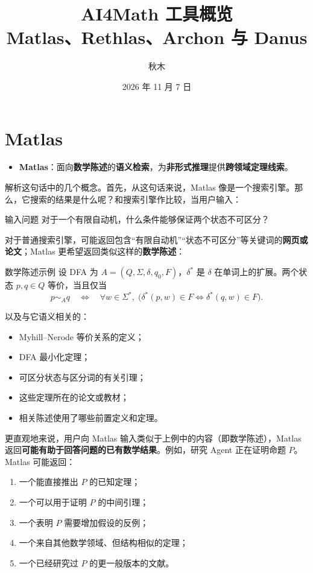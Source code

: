 \documentclass[11pt,a4paper]{ctexart}
\title{AI4Math 工具概览\\[0.35em]\large Matlas、Rethlas、Archon 与 Danus}
\author{秋木}
\date{2026 年 11 月 7 日}
\begin{document}
\maketitle

\section*{Matlas}

\begin{itemize}
  \item \textbf{Matlas}：面向\textbf{数学陈述}的\textbf{语义检索}，为\textbf{非形式推理}提供\textbf{跨领域定理线索}。
\end{itemize}

解析这句话中的几个概念。首先，从这句话来说，Matlas 像是一个搜索引擎。那么，它搜索的结果是什么呢？和搜索引擎作比较，当用户输入：

\begin{statementbox}{输入问题}
对于一个有限自动机，什么条件能够保证两个状态不可区分？
\end{statementbox}

对于普通搜索引擎，可能返回包含“有限自动机”“状态不可区分”等关键词的\textbf{网页或论文}；Matlas 更希望返回类似这样的\textbf{数学陈述}：

\begin{statementbox}{数学陈述示例}
设 DFA 为 $A=(Q,\Sigma,\delta,q_0,F)$，$\delta^{\ast}$ 是 $\delta$ 在单词上的扩展。两个状态 $p,q\in Q$ 等价，当且仅当
\[
p\sim_A q
\quad\Longleftrightarrow\quad
\forall w\in\Sigma^{\ast},\;
\bigl(\delta^{\ast}(p,w)\in F
\iff
\delta^{\ast}(q,w)\in F\bigr).
\]
\end{statementbox}

以及与它语义相关的：

\begin{itemize}
  \item Myhill--Nerode 等价关系的定义；
  \item DFA 最小化定理；
  \item 可区分状态与区分词的有关引理；
  \item 这些定理所在的论文或教材；
  \item 相关陈述使用了哪些前置定义和定理。
\end{itemize}

更直观地来说，用户向 Matlas 输入类似于上例中的内容（即数学陈述），Matlas 返回\textbf{可能有助于回答问题的已有数学结果}。例如，研究 Agent 正在证明命题 $P$。Matlas 可能返回：

\begin{enumerate}
  \item 一个能直接推出 $P$ 的已知定理；
  \item 一个可以用于证明 $P$ 的中间引理；
  \item 一个表明 $P$ 需要增加假设的反例；
  \item 一个来自其他数学领域、但结构相似的定理；
  \item 一个已经研究过 $P$ 的更一般版本的文献。
\end{enumerate}
\end{document}
